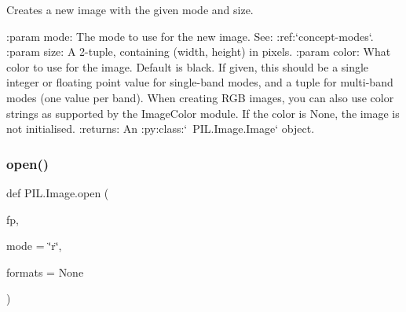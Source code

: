 \begin{DoxyVerb}Creates a new image with the given mode and size.

:param mode: The mode to use for the new image. See:
   :ref:`concept-modes`.
:param size: A 2-tuple, containing (width, height) in pixels.
:param color: What color to use for the image.  Default is black.
   If given, this should be a single integer or floating point value
   for single-band modes, and a tuple for multi-band modes (one value
   per band).  When creating RGB images, you can also use color
   strings as supported by the ImageColor module.  If the color is
   None, the image is not initialised.
:returns: An :py:class:`~PIL.Image.Image` object.
\end{DoxyVerb}
 \mbox{\label{namespacePIL_1_1Image_ab9bdc9a51ac412455e608c8fec4242b9}} 
\subsubsection{\texorpdfstring{open()}{open()}}
{\footnotesize\ttfamily def P\+I\+L.\+Image.\+open (\begin{DoxyParamCaption}\item[{}]{fp,  }\item[{}]{mode = {\ttfamily \char`\"{}r\char`\"{}},  }\item[{}]{formats = {\ttfamily None} }\end{DoxyParamCaption})}

